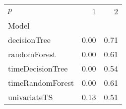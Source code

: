 \begin{tabular}{lrr}
\toprule
$p$ & 1 & 2 \\
Model &  &  \\
\midrule
decisionTree & 0.00 & 0.71 \\
randomForest & 0.00 & 0.61 \\
timeDecisionTree & 0.00 & 0.54 \\
timeRandomForest & 0.00 & 0.61 \\
univariateTS & 0.13 & 0.51 \\
\bottomrule
\end{tabular}
